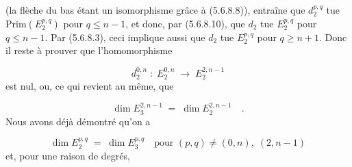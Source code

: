 \begin{center}
\end{center}
(la flèche du bas étant un isomorphisme grâce à (5.6.8.8)), entraîne que $d_2^{p,q}$ tue $\mathrm{Prim}(E_2^{p,q})$ pour $q \leq n - 1$, et donc, par (5.6.8.10), que $d_2$ tue $E_2^{p,q}$ pour $q \leq n - 1$. Par (5.6.8.3), ceci implique aussi que $d_2$ tue $E_2^{p,q}$ pour $q \geq n + 1$. Donc il reste à prouver que l'homomorphisme

\begin{equation*}
d_2^{0,n} \;:\; E_2^{0,n} \;\longrightarrow\; E_2^{2,n-1}
\end{equation*}
est nul, ou, ce qui revient au même, que

\begin{equation}\tag{5.6.8.12}
\dim E_3^{2,n-1} \;=\; \dim E_2^{2,n-1} \quad .
\end{equation}
Nous avons déjà démontré qu'on a

\begin{equation}\tag{5.6.8.13}
\dim E_2^{p,q} \;=\; \dim E_3^{p,q} \quad \text{pour } (p,q) \neq (0,n),\; (2,n-1)
\end{equation}
et, pour une raison de degrés,

